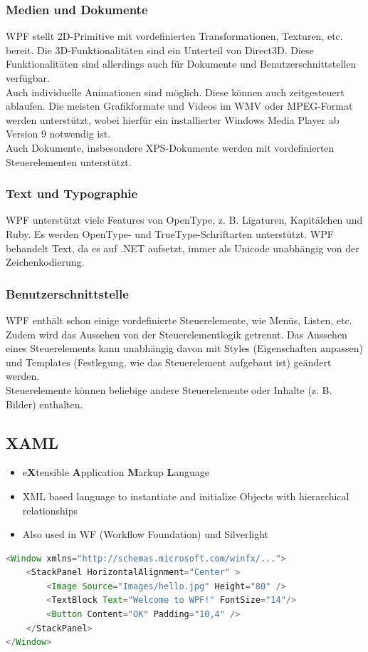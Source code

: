 \documentclass[10pt]{article}
\begin{document}
\subsubsection{Medien und Dokumente}
WPF stellt 2D-Primitive mit vordefinierten Transformationen, Texturen, etc. bereit. Die 3D-Funktionalitäten sind ein Unterteil von Direct3D. Diese Funktionalitäten sind allerdings auch für Dokumente und Benutzerschnittstellen verfügbar. \\
Auch individuelle Animationen sind möglich. Diese können auch zeitgesteuert ablaufen.
Die meisten Grafikformate und Videos im WMV oder MPEG-Format werden unterstützt, wobei hierfür ein installierter Windows Media Player ab Version 9 notwendig ist. \\
Auch Dokumente, insbesondere XPS-Dokumente werden mit vordefinierten Steuerelementen unterstützt.
\subsubsection{Text und Typographie}
WPF unterstützt viele Features von OpenType, z. B. Ligaturen, Kapitälchen und Ruby. Es werden OpenType- und TrueType-Schriftarten unterstützt. WPF behandelt Text, da es auf .NET aufsetzt, immer als Unicode unabhängig von der Zeichenkodierung.
\subsubsection{Benutzerschnittstelle}
WPF enthält schon einige vordefinierte Steuerelemente, wie Menüs, Listen, etc. \\
Zudem wird das Aussehen von der Steuerelementlogik getrennt. Das Aussehen eines Steuerelements kann unabhängig davon mit Styles (Eigenschaften anpassen) und Templates (Festlegung, wie das Steuerelement aufgebaut ist) geändert werden. \\
Steuerelemente können beliebige andere Steuerelemente oder Inhalte (z. B. Bilder) enthalten.
\subsection{XAML}
\begin{itemize}
	\item e\textbf{X}tensible \textbf{A}pplication \textbf{M}arkup \textbf{L}anguage
	\item XML based language to instantiate and initialize Objects with hierarchical relationships
	\item Also used in WF (Workflow Foundation) und Silverlight
\end{itemize}
\begin{lstlisting}[language=Java, caption=xaml, style=JavaStyle]
<Window xmlns="http://schemas.microsoft.com/winfx/...">
	<StackPanel HorizontalAlignment="Center" >
		<Image Source="Images/hello.jpg" Height="80" />
		<TextBlock Text="Welcome to WPF!" FontSize="14"/>
		<Button Content="OK" Padding="10,4" />
	</StackPanel>
</Window>
\end{lstlisting}
\end{document}
